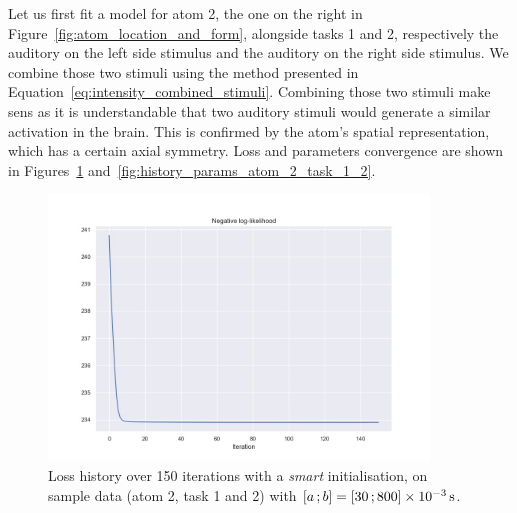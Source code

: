 Let us first fit a model for atom 2, the one on the right in Figure~\ref{fig:atom_location_and_form}, alongside tasks 1 and 2, respectively the auditory on the left side stimulus and  the auditory on the right side stimulus.
We combine those two stimuli using the method presented in Equation~\eqref{eq:intensity_combined_stimuli}.
Combining those two stimuli make sens as it is understandable that two auditory stimuli would generate a similar activation in the brain.
This is confirmed by the atom's spatial representation, which has a certain axial symmetry.
Loss and parameters convergence are shown in Figures~\ref{fig:history_loss_atom_2_task_1_2} and~\ref{fig:history_params_atom_2_task_1_2}.

\begin{figure}[h!]
    \centering
    \includegraphics[width=0.9\textwidth]{pics/results_sample/history_loss_atom_2_task_1_2.jpg}
    \caption{Loss history over 150 iterations with a \textit{smart} initialisation, on sample data (atom 2, task 1 and 2) with $\left[ a \, ; b \right] = \left[ 30 \, ; 800 \right]\times \SI{e-3}{\second}$.}
    \label{fig:history_loss_atom_2_task_1_2}
\end{figure}

